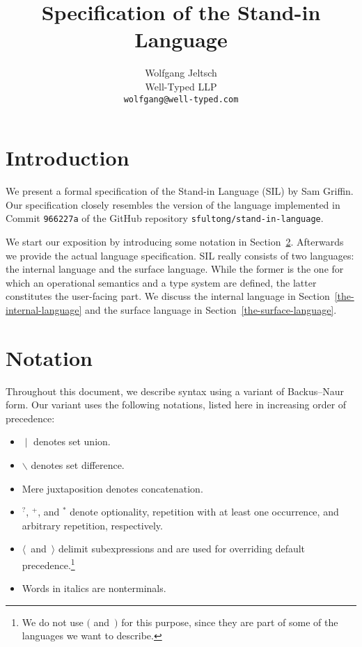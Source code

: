 \documentclass{scrartcl}
\title{Specification of the Stand-in Language}
\author{%
    Wolfgang Jeltsch\\
    \small Well-Typed LLP\\
    \small\texttt{wolfgang@well-typed.com}%
}
\newcommand{\optional}{^{?}}
\newcommand{\some}{^{+}}
\newcommand{\many}{^{*}}
\begin{document}
\maketitle

\section{Introduction}

We present a formal specification of the Stand-in Language (SIL) by Sam
Griffin. Our specification closely resembles the version of the language
implemented in Commit \texttt{966227a} of the GitHub repository
\texttt{sfultong/stand-in-language}.

We start our exposition by introducing some notation in
Section~\ref{notation}. Afterwards we provide the actual language
specification. SIL really consists of two languages: the internal
language and the surface language. While the former is the one for which
an operational semantics and a type system are defined, the latter
constitutes the user-facing part. We discuss the internal language in
Section~\ref{the-internal-language} and the surface language in
Section~\ref{the-surface-language}.

\section{Notation}
\label{notation}

Throughout this document, we describe syntax using a variant of
Backus–Naur form. Our variant uses the following notations, listed here
in increasing order of precedence:
\begin{itemize}

\item

$∣$ denotes set union.

\item

$∖$ denotes set difference.

\item

Mere juxtaposition denotes concatenation.

\item

$\optional$, $\some$, and $\many$ denote optionality, repetition with at
least one occurrence, and arbitrary repetition, respectively.

\item

$⟨$~and~$⟩$ delimit subexpressions and are used for overriding default
precedence.\footnote{We do not use $($ and~$)$ for this purpose, since
they are part of some of the languages we want to describe.}

\item

Words in italics are nonterminals.

\end{itemize}
\end{document}
